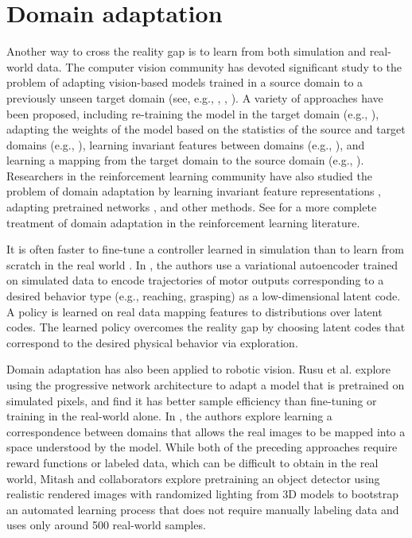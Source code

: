 \section{Domain adaptation}
Another way to cross the reality gap is to learn from both simulation and real-world data. The computer vision community has devoted significant study to the problem of adapting vision-based models trained in a source domain to a previously unseen target domain (see, e.g., \cite{hoffman2014lsda}, \cite{hoffman2013efficient}, \cite{long2015learning}). A variety of approaches have been proposed, including re-training the model in the target domain (e.g., \cite{yosinski2014transferable}),  adapting the weights of the model based on the statistics of the source and target domains (e.g., \cite{li2016revisiting}), learning invariant features between domains (e.g., \cite{tzeng2014deep}), and learning a mapping from the target domain to the source domain (e.g., \cite{taigman2016unsupervised}). Researchers in the reinforcement learning community have also studied the problem of domain adaptation by learning invariant feature representations \cite{gupta2017learning}, adapting pretrained networks \cite{rusu2016progressive}, and other methods. See \cite{gupta2017learning} for a more complete treatment of domain adaptation in the reinforcement learning literature.

It is often faster to fine-tune a controller learned in simulation than to learn from scratch in the real world \cite{cutler2015efficient, kolter2007learning}. In \cite{ghadirzadeh2017deep}, the authors use a variational autoencoder trained on simulated data to encode trajectories of motor outputs corresponding to a desired behavior type (e.g., reaching, grasping) as a low-dimensional latent code. A policy is learned on real data mapping features to distributions over latent codes. The learned policy overcomes the reality gap by choosing latent codes that correspond to the desired physical behavior via exploration.

Domain adaptation has also been applied to robotic vision. Rusu et al. \cite{rusu2016sim} explore using the progressive network architecture to adapt a model that is pretrained on simulated pixels, and find it has better sample efficiency than fine-tuning or training in the real-world alone. In \cite{tzeng2015adapting}, the authors explore learning a correspondence between domains that allows the real images to be mapped into a space understood by the model. While both of the preceding approaches require reward functions or labeled data, which can be difficult to obtain in the real world, Mitash and collaborators \cite{mitash2017self} explore pretraining an object detector using realistic rendered images with randomized lighting from 3D models to bootstrap an automated learning process that does not require manually labeling data and uses only around 500 real-world samples.

